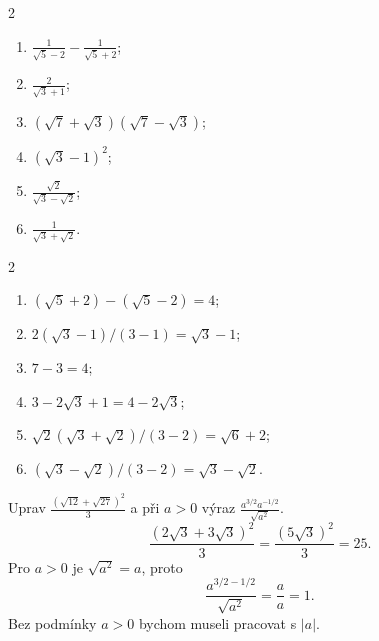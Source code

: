\documentclass[11pt,a4paper]{article}
\begin{document}
\begin{zadaniReseniBox}[breakable=false,title={Samostatná práce 2}]
\begin{multicols}{2}
\begin{enumerate}[label=\alph*)]
\item $\displaystyle\frac1{\sqrt5-2}-\frac1{\sqrt5+2}$;
\item $\displaystyle\frac2{\sqrt3+1}$;
\item $(\sqrt7+\sqrt3)(\sqrt7-\sqrt3)$;
\item $(\sqrt3-1)^2$;
\item $\displaystyle\frac{\sqrt2}{\sqrt3-\sqrt2}$;
\item $\displaystyle\frac1{\sqrt3+\sqrt2}$.
\end{enumerate}
\end{multicols}
\tcblower
\begin{multicols}{2}
\begin{enumerate}[label=\alph*)]
\item $(\sqrt5+2)-(\sqrt5-2)=\boxed4$;
\item $2(\sqrt3-1)/(3-1)=\boxed{\sqrt3-1}$;
\item $7-3=\boxed4$;
\item $3-2\sqrt3+1=\boxed{4-2\sqrt3}$;
\item $\sqrt2(\sqrt3+\sqrt2)/(3-2)=\boxed{\sqrt6+2}$;
\item $(\sqrt3-\sqrt2)/(3-2)=\boxed{\sqrt3-\sqrt2}$.
\end{enumerate}
\end{multicols}
\end{zadaniReseniBox}

\begin{prikladReseniBox}[breakable=false,title={Příklad 3}]
Uprav $\displaystyle\frac{(\sqrt{12}+\sqrt{27})^2}{3}$
a při $a>0$ výraz $\displaystyle\frac{a^{3/2}a^{-1/2}}{\sqrt{a^2}}$.
\tcblower
\[
\frac{(2\sqrt3+3\sqrt3)^2}{3}
=\frac{(5\sqrt3)^2}{3}=\boxed{25}.
\]
Pro $a>0$ je $\sqrt{a^2}=a$, proto
\[
\frac{a^{3/2-1/2}}{\sqrt{a^2}}=\frac aa=\boxed1.
\]
Bez podmínky $a>0$ bychom museli pracovat s $|a|$.
\end{prikladReseniBox}
\end{document}
